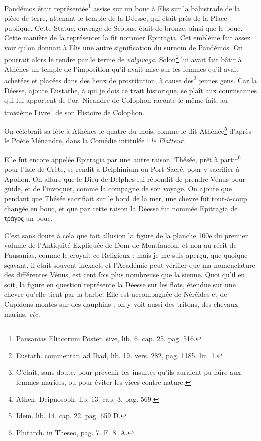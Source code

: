 \documentclass[a4paper, 11pt, oneside, polutonikogreek, french]{article}
\begin{document}
Pandémos était représentée\footnote{Pausanias Eliacorum Poster. sive, lib. 6. cap. 25. pag. 516.} assise sur un bouc à Elis sur la balustrade de la pièce de terre, attenant le temple de la Déesse, qui était près de la Place publique. Cette Statue, ouvrage de Scopas, était de bronze, ainsi que le bouc. Cette manière de la représenter la fit nommer Epitragia. Cet emblème fait assez voir qu'on donnait à Elis une autre signification du surnom de Pandémos. On pourrait alors le rendre par le terme de \emph{volgivaga}. Solon\footnote{Eustath. commentar. ad Iliad, lib. 19. vers. 282, pag. 1185. lin. 1.} lui avait fait bâtir à Athènes un temple de l'imposition qu'il avait mise sur les femmes qu'il avait achetées et placées dans des lieux de prostitution, à cause des\footnote{C'était, sans doute, pour prévenir les insultes qu'ils auraient pu faire aux femmes mariées, ou pour éviter les vices contre nature.} jeunes gens. Car la Déesse, ajoute Eustathe, à qui je dois ce trait historique, se plaît aux courtisannes qui lui apportent de l'or. Nicandre de Colophon raconte le même fait, au troisième Livre\footnote{Athen. Deipnosoph. lib. 13. cap. 3. pag. 569.} de son Histoire de Colophon.

On célébrait sa fête à Athènes le quatre du mois, comme le dit Athénée\footnote{Idem. lib. 14. cap. 22. pag. 659 D.} d'après le Poète Ménandre, dans la Comédie intitulée : \emph{le Flatteur}.

Elle fut encore appelée Epitragia par une autre raison. Thésée, prêt à partir\footnote{Plutarch. in Theseo, pag. 7. F. 8. A.} pour l'Isle de Crète, se rendit à Delphinium ou Port Sacré, pour y sacrifier à Apollon. On allure que le Dieu de Delphes lui répondit de prendre Vénus pour guide, et de l'invoquer, comme la compagne de son voyage. On ajoute que pendant que Thésée sacrifiait sur le bord de la mer, une chevre fut tout-à-coup changée en bouc, et que par cette raison la Déesse fut nommée Epitragia de τράγος un bouc.

C'est sans doute à cela que fait allusion la figure de la planche 100e du premier volume de l'Antiquité Expliquée de Dom de Montfaucon, et non au récit de Pausanias, comme le croyait ce Religieux ; mais je me suis aperçu, que quoique sçavant, il était souvent inexact, et l'Académie peut vérifier que ma nomenclature des différentes Vénus, est cent fois plus nombreuse que la sienne. Quoi qu'il en soit, la figure en question représente la Déesse sur les flots, étendue sur une chevre qu'elle tient par la barbe. Elle est accompagnée de Néréides et de Cupidons montés sur des dauphins ; on y voit aussi des tritons, des chevaux marins, \emph{etc.}
\end{document}

